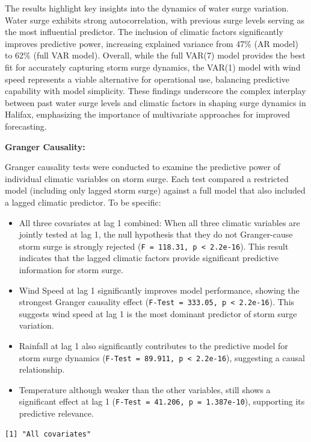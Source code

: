 \documentclass[
  letterpaper,
  DIV=11,
  numbers=noendperiod]{scrartcl}
\begin{document}
The results highlight key insights into the dynamics of water surge
variation. Water surge exhibits strong autocorrelation, with previous
surge levels serving as the most influential predictor. The inclusion of
climatic factors significantly improves predictive power, increasing
explained variance from 47\% (AR model) to 62\% (full VAR model).
Overall, while the full VAR(7) model provides the best fit for
accurately capturing storm surge dynamics, the VAR(1) model with wind
speed represents a viable alternative for operational use, balancing
predictive capability with model simplicity. These findings underscore
the complex interplay between past water surge levels and climatic
factors in shaping surge dynamics in Halifax, emphasizing the importance
of multivariate approaches for improved forecasting.

\textbf{Granger Causality:}

Granger causality tests were conducted to examine the predictive power
of individual climatic variables on storm surge. Each test compared a
restricted model (including only lagged storm surge) against a full
model that also included a lagged climatic predictor. To be specific:

\begin{itemize}
\item
  All three covariates at lag 1 combined: When all three climatic
  variables are jointly tested at lag 1, the null hypothesis that they
  do not Granger-cause storm surge is strongly rejected
  (\texttt{F\ =\ 118.31,\ p\ \textless{}\ 2.2e-16}). This result
  indicates that the lagged climatic factors provide significant
  predictive information for storm surge.
\item
  Wind Speed at lag 1 significantly improves model performance, showing
  the strongest Granger causality effect
  (\texttt{F-Test\ =\ 333.05,\ p\ \textless{}\ 2.2e-16}). This suggests
  wind speed at lag 1 is the most dominant predictor of storm surge
  variation.
\item
  Rainfall at lag 1 also significantly contributes to the predictive
  model for storm surge dynamics
  (\texttt{F-Test\ =\ 89.911,\ p\ \textless{}\ 2.2e-16}), suggesting a
  causal relationship.
\item
  Temperature although weaker than the other variables, still shows a
  significant effect at lag 1
  (\texttt{F-Test\ =\ 41.206,\ p\ =\ 1.387e-10}), supporting its
  predictive relevance.
\end{itemize}

\begin{verbatim}
[1] "All covariates"
\end{verbatim}
\end{document}
